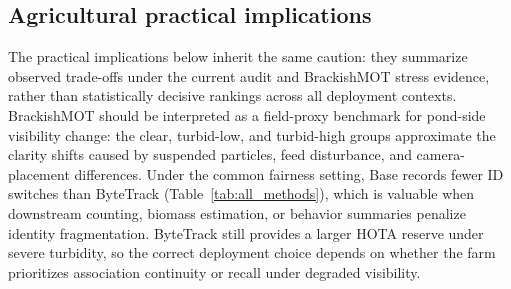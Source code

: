 \documentclass[5p,twocolumn,a4paper]{elsarticle}
\begin{document}
\subsection{Agricultural practical implications}
The practical implications below inherit the same caution: they summarize observed trade-offs under the current audit and BrackishMOT stress evidence, rather than statistically decisive rankings across all deployment contexts.
BrackishMOT should be interpreted as a field-proxy benchmark for pond-side visibility change: the clear, turbid-low, and turbid-high groups approximate the clarity shifts caused by suspended particles, feed disturbance, and camera-placement differences. Under the common fairness setting, Base records fewer ID switches than ByteTrack (Table~\ref{tab:all_methods}), which is valuable when downstream counting, biomass estimation, or behavior summaries penalize identity fragmentation. ByteTrack still provides a larger HOTA reserve under severe turbidity, so the correct deployment choice depends on whether the farm prioritizes association continuity or recall under degraded visibility.
\end{document}
